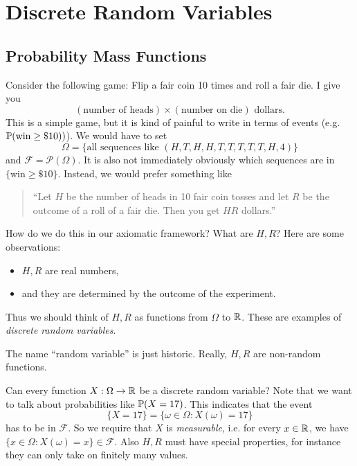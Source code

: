 \chapter{Discrete Random Variables}

\section{Probability Mass Functions}
\begin{example}
  Consider the following game: Flip a fair
  coin 10 times and roll a fair die. I give you
  \[
    (\text{number of heads}) \times (\text{number on die})
    \text{ dollars}.
  \]
  This is a simple game, but it is kind of
  painful to write in terms of events
  (e.g. $\mathbb{P}(\text{win} \ge \$10))$).
  We would have to set
  \[
    \Omega = \{\text{all sequences like } (H, T, H, H, T, T, T, T, T, H, 4)\}
  \]
  and $\mathcal{F} = \mathcal{P}(\Omega)$. It is
  also not immediately obviously which
  sequences are in $\{\text{win} \ge \$10\}$. Instead,
  we would prefer something like
  \begin{quote}
    ``Let $H$ be the number of heads in 10
    fair coin tosses and let $R$ be the outcome
    of a roll of a fair die. Then you get $HR$ dollars.''
  \end{quote}
  How do we do this in our axiomatic framework?
  What are $H, R$? Here are some observations:
  \begin{itemize}
    \item $H, R$ are real numbers,
    \item and they are determined by the outcome of the
      experiment.
  \end{itemize}
  Thus we should think of $H, R$ as functions
  from $\Omega$ to $\mathbb{R}$. These are examples of
  \emph{discrete random variables}.
\end{example}

\begin{remark}
  The name ``random variable'' is just
  historic. Really, $H, R$ are non-random functions.
\end{remark}

\begin{remark}
  Can every function $X : \Omega \to \mathbb{R}$
  be a discrete random variable? Note that we want to
  talk about probabilities like
  $\mathbb{P}(X = 17)$. This indicates that the event
  \[
    \{X = 17\} = \{\omega \in \Omega : X(\omega) = 17\}
  \]
  has to be in $\mathcal{F}$. So we require that
  $X$ is \emph{measurable}, i.e. for
  every $x \in \mathbb{R}$, we have
  $\{x \in \Omega : X(\omega) = x\} \in \mathcal{F}$.
  Also $H, R$ must have special properties,
  for instance they can only take on finitely many
  values.
\end{remark}

